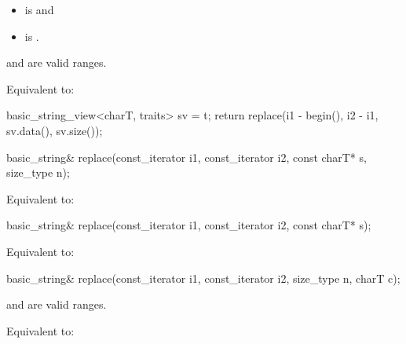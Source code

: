 \begin{itemdescr}
\pnum
\constraints
\begin{itemize}
\item
{} is
 and
\item
{} is
.
\end{itemize}

\pnum
\expects
{} and  are valid ranges.

\pnum
\effects
Equivalent to:
\begin{codeblock}
basic_string_view<charT, traits> sv = t;
return replace(i1 - begin(), i2 - i1, sv.data(), sv.size());
\end{codeblock}
\end{itemdescr}

%
\begin{itemdecl}
basic_string& replace(const_iterator i1, const_iterator i2, const charT* s, size_type n);
\end{itemdecl}

\begin{itemdescr}
\pnum
\effects
Equivalent to: 
\end{itemdescr}

%
\begin{itemdecl}
basic_string& replace(const_iterator i1, const_iterator i2, const charT* s);
\end{itemdecl}

\begin{itemdescr}
\pnum
\effects
Equivalent to: 
\end{itemdescr}

%
\begin{itemdecl}
basic_string& replace(const_iterator i1, const_iterator i2, size_type n, charT c);
\end{itemdecl}

\begin{itemdescr}
\pnum
\expects {} and  are valid ranges.

\pnum
\effects
Equivalent to: 
\end{itemdescr}

